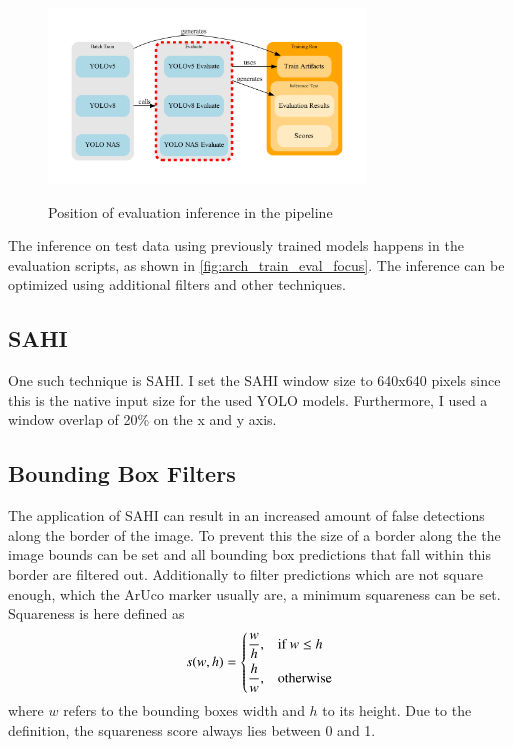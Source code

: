 \documentclass[10pt]{book}
\begin{document}
\begin{figure}
  \caption{Position of evaluation inference in the pipeline}
  \includegraphics[width=0.75\textwidth]{graph/arch_train_eval_focus}
  \label{fig:arch_train_eval_focus}
\end{figure}

The inference on test data using previously trained models happens in the evaluation scripts, as shown in \autoref{fig:arch_train_eval_focus}. The inference can be optimized using additional filters and other techniques. 

\subsection{SAHI}

One such technique is \ac{SAHI}. 
I set the \ac{SAHI} window size to 640x640 pixels since this is the native input size for the used \ac{YOLO} models. Furthermore, I used a window overlap of 20\% on the x and y axis.

\subsection{Bounding Box Filters}

The application of \ac{SAHI} can result in an increased amount of false detections along the border of the image. To prevent this the size of a border along the the image bounds can be set and all bounding box predictions that fall within this border are filtered out. Additionally to filter predictions which are not square enough, which the \ac{ArUco} marker usually are, a minimum squareness can be set. Squareness is here defined as $$ 
s(w,h)=
\begin{dcases}
    \frac{w}{h}, & \text{if } w\leq h\\
    \frac{h}{w}, & \text{otherwise}
\end{dcases} $$ where $w$ refers to the bounding boxes width and $h$ to its height. Due to the definition, the squareness score always lies between 0 and 1.
\end{document}
